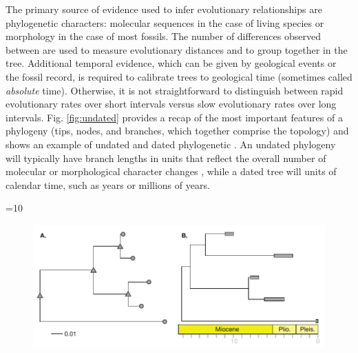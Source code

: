 The primary source of evidence used to infer evolutionary relationships are phylogenetic characters: molecular sequences  in the case of living species or morphology in the case of most fossils.
The number of differences observed between  are used to measure evolutionary distances and to group  together in the tree.
Additional temporal evidence, which can be given by geological events or the fossil record, is required to calibrate trees to geological time (sometimes called \textit{absolute} time).
Otherwise, it is not straightforward to distinguish between rapid evolutionary rates over short intervals versus slow evolutionary rates over long intervals.
Fig. \ref{fig:undated} provides a recap of the most important features of a phylogeny (tips, nodes, and branches, which together comprise the  topology) and shows an example of %
undated and dated phylogenetic .
An undated phylogeny will typically have branch lengths in units that reflect the overall number of molecular or morphological character changes , while a dated tree will  units of calendar time, such as years or millions of years.

\ifnum\value{num}=10{
\begin{figure}
\centering
\includegraphics[width=\textwidth]{Cambridge-Elements/manuscript.R3/submitted_figs/figure1}

\end{figure} }\else{}\fi

